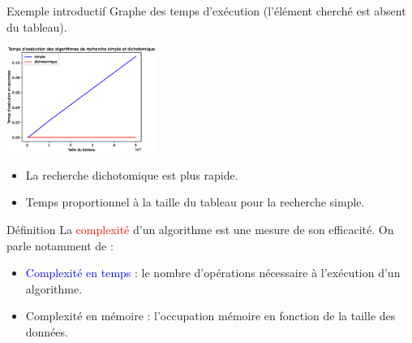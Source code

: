 \documentclass[10pt]{beamer}
\begin{document}
\begin{frame}[fragile]{\Ctitle}{\stitle}
    \begin{exampleblock}{Exemple introductif}
        Graphe des temps d'exécution (l'élément cherché est absent du tableau).
        \begin{center}
            \includegraphics[height=130px]{recherche.eps}
        \end{center}
        \begin{itemize}
            \item<2-> La recherche dichotomique est plus rapide.
            \item<3-> Temps proportionnel à la taille du tableau pour la recherche simple.
        \end{itemize}
    \end{exampleblock}
\end{frame}

\begin{frame}[fragile]{\Ctitle}{\stitle}
    \begin{alertblock}{Définition}
        La \textcolor{red}{complexité} d'un algorithme est une mesure de son efficacité.
         On parle notamment de :
        \begin{itemize}
            \item<3-> \textcolor{blue}{Complexité en temps} : le nombre d'opérations nécessaire à l'exécution d'un algorithme.
            \item<4-> Complexité en mémoire : l'occupation mémoire en fonction de la taille des données.
        \end{itemize}
    \end{alertblock}
\end{frame}
\end{document}
